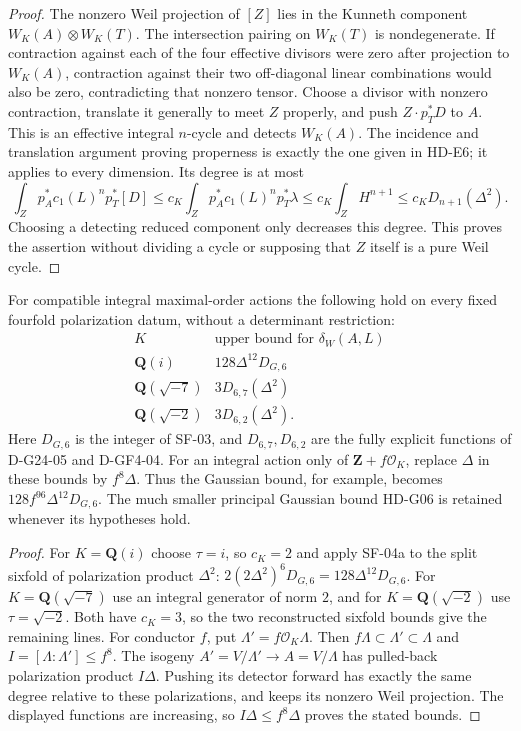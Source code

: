 \begin{proof}
The nonzero Weil projection of $[Z]$ lies in the Kunneth component
$W_K(A)\otimes W_K(T)$. The intersection pairing on $W_K(T)$ is
nondegenerate. If contraction against each of the four effective
divisors were zero after projection to $W_K(A)$, contraction
against their two off-diagonal linear combinations would also be
zero, contradicting that nonzero tensor. Choose a divisor with
nonzero contraction, translate it generally to meet $Z$ properly,
and push $Z\cdot p_T^*D$ to $A$. This is an effective integral
$n$-cycle and detects $W_K(A)$. The incidence and translation
argument proving properness is exactly the one given in HD-E6;
it applies to every dimension. Its degree is at most
\[
 \int_Z p_A^*c_1(L)^n p_T^*[D]
 \le c_K\int_Z p_A^*c_1(L)^n p_T^*\lambda
 \le c_K\int_Z H^{n+1}
 \le c_K D_{n+1}(\Delta^2).
\]
Choosing a detecting reduced component only decreases this degree.
This proves the assertion without dividing a cycle or supposing
that $Z$ itself is a pure Weil cycle.
\end{proof}

\begin{corollary}
\label{HD-COMP4}
For compatible integral maximal-order actions the following hold on
every fixed fourfold polarization datum, without a determinant
restriction:
\[
\begin{array}{c|c}
 K & \text{upper bound for }\delta_W(A,L)\\ \hline
 \mathbf Q(i) & 128\Delta^{12}D_{G,6}\\
 \mathbf Q(\sqrt{-7}) & 3D_{6,7}(\Delta^2)\\
 \mathbf Q(\sqrt{-2}) & 3D_{6,2}(\Delta^2).
\end{array}
\]
Here $D_{G,6}$ is the integer of SF-03, and $D_{6,7},D_{6,2}$
are the fully explicit functions of D-G24-05 and D-GF4-04.
For an integral action only of $\mathbf Z+f\mathcal O_K$, replace
$\Delta$ in these bounds by $f^8\Delta$. Thus the Gaussian
bound, for example, becomes $128f^{96}\Delta^{12}D_{G,6}$.
The much smaller principal Gaussian bound HD-G06 is retained
whenever its hypotheses hold.
\end{corollary}
\begin{proof}
For $K=\mathbf Q(i)$ choose $\tau=i$, so $c_K=2$ and apply
SF-04a to the split sixfold of polarization product $\Delta^2$:
$2(2\Delta^2)^6D_{G,6}=128\Delta^{12}D_{G,6}$.
For $K=\mathbf Q(\sqrt{-7})$ use an integral generator of norm
$2$, and for $K=\mathbf Q(\sqrt{-2})$ use $\tau=\sqrt{-2}$.
Both have $c_K=3$, so the two reconstructed sixfold bounds give
the remaining lines. For conductor $f$, put
$\Lambda'=f\mathcal O_K\Lambda$. Then
$f\Lambda\subset\Lambda'\subset\Lambda$ and
$I=[\Lambda:\Lambda']\le f^8$. The isogeny
$A'=V/\Lambda'\to A=V/\Lambda$ has pulled-back polarization
product $I\Delta$. Pushing its detector forward has exactly the
same degree relative to these polarizations, and keeps its nonzero
Weil projection. The displayed functions are increasing, so
$I\Delta\le f^8\Delta$ proves the stated bounds.
\end{proof}

